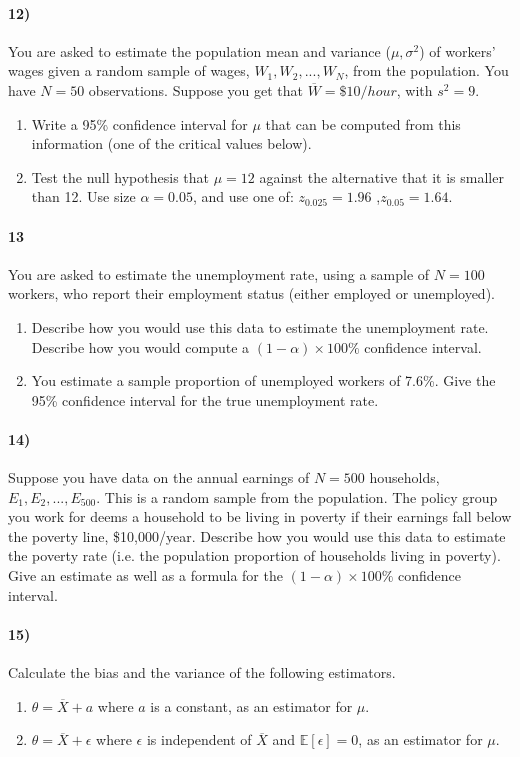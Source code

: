 \documentclass[12pt]{article}
\newcommand\ov{\overline}
\newcommand\EE{\mathbb{E}}
\numberwithin{equation}{section}
\numberwithin{figure}{section}
\numberwithin{table}{section}
\begin{document}
\paragraph{12)} You are asked to estimate the population mean and variance ($\mu,\sigma^2$) of workers' wages given a random sample of wages, $W_1,W_2,...,W_N$, from the population. You have $N=50$ observations. Suppose you get that $\ov{W}=\$10/hour$, with $s^2=9$.
\begin{enumerate}
\item Write a 95\% confidence interval for $\mu$ that can be computed from this information (one of the critical values below).
\item Test the null hypothesis that $\mu=12$ against the alternative that it is smaller than 12. Use size $\alpha=0.05$, and use one of: $z_{0.025}=1.96$ ,$z_{0.05}=1.64$.
\end{enumerate}

\paragraph{13} You are asked to estimate the unemployment rate, using a sample of $N=100$ workers, who report their employment status (either employed or unemployed).
\begin{enumerate}
\item Describe how you would use this data to estimate the unemployment rate. Describe how you would compute a $(1-\alpha)\times100\%$ confidence interval.
\item You estimate a sample proportion of unemployed workers of 7.6\%. Give the 95\% confidence interval for the true unemployment rate.
\end{enumerate}

\paragraph{14)} Suppose you have data on the annual earnings of $N=500$ households, $E_1,E_2,...,E_{500}$. This is a random sample from the population. The policy group you work for deems a household to be living in poverty if their earnings fall below the poverty line, \$10,000/year. Describe how you would use this data to estimate the poverty rate (i.e. the population proportion of households living in poverty). Give an estimate as well as a formula for the $(1-\alpha)\times100\%$ confidence interval.


\paragraph{15)} Calculate the bias and the variance of the following estimators.
\begin{enumerate}
\item $\theta=\ov{X}+a$ where $a$ is a constant, as an estimator for $\mu$.
\item $\theta=\ov{X}+\epsilon$ where $\epsilon$ is independent of $\ov{X}$ and $\EE[\epsilon]=0$, as an estimator for $\mu$.
\end{enumerate}
\end{document}

